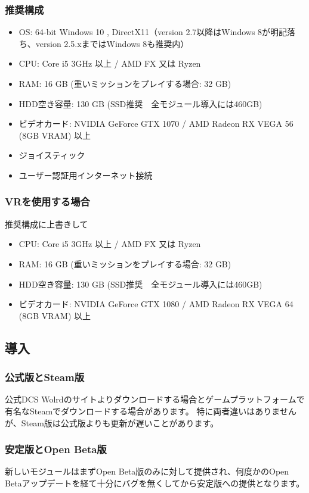 \subsubsection{推奨構成}
\begin{itemize}
  \item OS: 64-bit Windows 10 , DirectX11（version 2.7以降はWindows 8が明記落ち、version 2.5.xまではWindows 8も推奨内）
  \item CPU: Core i5 3GHz 以上 / AMD FX 又は Ryzen
  \item RAM: 16 GB (重いミッションをプレイする場合: 32 GB)
  \item HDD空き容量: 130 GB (SSD推奨　全モジュール導入には460GB)
  \item ビデオカード: NVIDIA GeForce GTX 1070 / AMD Radeon RX VEGA 56 (8GB VRAM) 以上
  \item ジョイスティック
  \item ユーザー認証用インターネット接続
\end{itemize}

\subsubsection{VRを使用する場合}
推奨構成に上書きして
\begin{itemize}
  \item CPU: Core i5 3GHz 以上 / AMD FX 又は Ryzen
  \item RAM: 16 GB (重いミッションをプレイする場合: 32 GB)
  \item HDD空き容量: 130 GB (SSD推奨　全モジュール導入には460GB)
  \item ビデオカード: NVIDIA GeForce GTX 1080 / AMD Radeon RX VEGA 64 (8GB VRAM) 以上
\end{itemize}

\subsection{導入}
\subsubsection{公式版とSteam版}
公式DCS Wolrdのサイトよりダウンロードする場合とゲームプラットフォームで有名なSteamでダウンロードする場合があります。
特に両者違いはありませんが、Steam版は公式版よりも更新が遅いことがあります。

\subsubsection{安定版とOpen Beta版}
新しいモジュールはまずOpen Beta版のみに対して提供され、何度かのOpen Betaアップデートを経て十分にバグを無くしてから安定版への提供となります。
  

